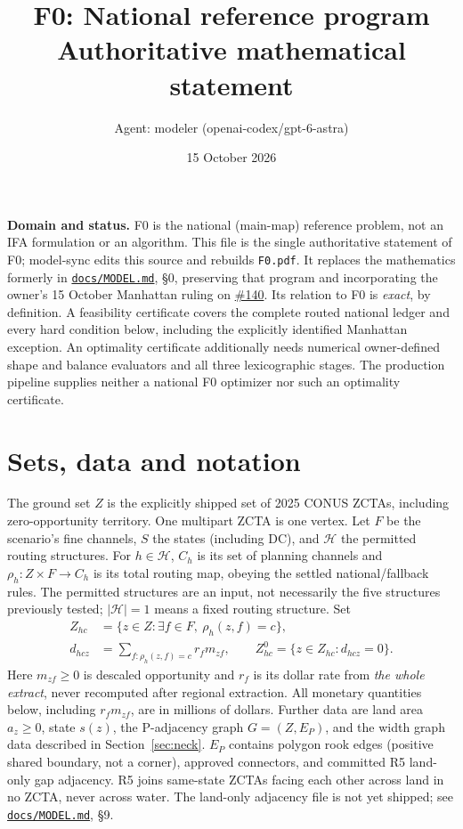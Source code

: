 \documentclass[11pt,letterpaper]{article}
\title{F0: National reference program\\\large Authoritative mathematical statement}
\author{Agent: modeler (openai-codex/gpt-6-astra)}
\date{15 October 2026}
\newcommand{\issue}[1]{\href{https://github.com/helios1168/td/issues/#1}{\##1}}
\newcommand{\MODEL}{\href{MODEL.md}{\texttt{docs/MODEL.md}}}
\begin{document}
\maketitle

\textbf{Domain and status.} F0 is the national (main-map) reference problem,
not an IFA formulation or an algorithm. This file is the single authoritative
statement of F0; model-sync edits this source and rebuilds \texttt{F0.pdf}.
It replaces the mathematics formerly in \MODEL, \S0, preserving that program
and incorporating the owner's 15 October Manhattan ruling on \issue{140}.
Its relation to F0 is \emph{exact}, by definition. A feasibility certificate
covers the complete routed national ledger and every hard condition below,
including the explicitly identified Manhattan exception. An optimality
certificate additionally needs numerical owner-defined shape and balance
evaluators and all three lexicographic stages. The production pipeline supplies
neither a national F0 optimizer nor such an optimality certificate.

\section{Sets, data and notation}
The ground set $Z$ is the explicitly shipped set of 2025 CONUS ZCTAs,
including zero-opportunity territory. One multipart ZCTA is one vertex.
Let $F$ be the scenario's fine channels, $S$ the states (including DC), and
$\mathcal H$ the permitted routing structures. For $h\in\mathcal H$,
$C_h$ is its set of planning channels and
$\rho_h:Z\times F\to C_h$ is its total routing map, obeying the settled
national/fallback rules. The permitted structures are an input, not
necessarily the five structures previously tested; $|\mathcal H|=1$
means a fixed routing structure. Set
\begin{equation}\label{eq:data}
\begin{aligned}
 Z_{hc}&=\{z\in Z:\exists f\in F,\ \rho_h(z,f)=c\},\\
 d_{hcz}&=\sum_{f:\rho_h(z,f)=c} r_f m_{zf},\qquad
 Z^0_{hc}=\{z\in Z_{hc}:d_{hcz}=0\}.
\end{aligned}
\end{equation}
Here $m_{zf}\ge0$ is descaled opportunity and $r_f$ is its dollar rate from
\emph{the whole extract}, never recomputed after regional extraction.
All monetary quantities below, including $r_f m_{zf}$, are in millions of dollars.
Further data are land area $a_z\ge0$, state $s(z)$, the P-adjacency graph
$G=(Z,E_P)$, and the width graph data described in Section~\ref{sec:neck}.
$E_P$ contains polygon rook edges (positive shared boundary, not a corner),
approved connectors, and committed R5 land-only gap adjacency. R5 joins
same-state ZCTAs facing each other across land in no ZCTA, never across water.
The land-only adjacency file is not yet shipped; see \MODEL, \S9.
\end{document}
